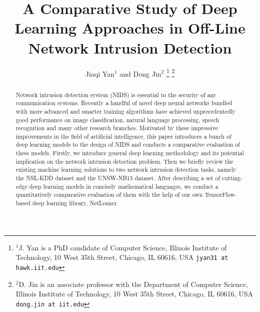 \documentclass[letterpaper, 10 pt, conference]{ieeeconf}  %
\title{\LARGE \bf
A Comparative Study of Deep Learning Approaches in Off-Line Network Intrusion Detection
}
\author{Jiaqi Yan$^{1}$ and Dong Jin$^{2}$%
\thanks{$^{1}$J. Yan is a PhD candidate of Computer Science,
        Illinois Institute of Technology, 10 West 35th Street, Chicago, IL 60616, USA
        {\tt\small jyan31 at hawk.iit.edu}}%
\thanks{$^{2}$D. Jin is an associate professor with the Department of Computer Science,
		Illinois Institute of Technology, 10 West 35th Street, Chicago, IL 60616, USA
        {\tt\small dong.jin at iit.edu}}%
}
\begin{document}
\maketitle
\thispagestyle{empty}
\pagestyle{empty}


\begin{abstract}
Network intrusion detection system (NIDS) is essential to the security of any communication systems.
Recently a handful of novel deep neural networks bundled with more advanced and smarter
training algorithms have achieved unprecedentedly good performance on image classification,
natural language processing, speech recognition and many other research branches.
Motivated by these impressive improvements in the field of artificial intelligence,
this paper introduces a bunch of deep learning models to the design of NIDS
and conducts a comparative evaluation of these models.
Firstly, we introduce general deep learning methodology and its potential implication on the
network intrusion detection problem.
Then we briefly review the existing machine learning solutions to two network intrusion detection tasks,
namely the NSL-KDD dataset and the UNSW-NB15 dataset.
After describing a set of cutting-edge deep learning models in concisely mathematical languages,
we conduct a quantitatively comparative evaluation of them with the help of
our own TensorFlow-based deep learning library, NetLeaner.
\end{abstract}












\end{document}
